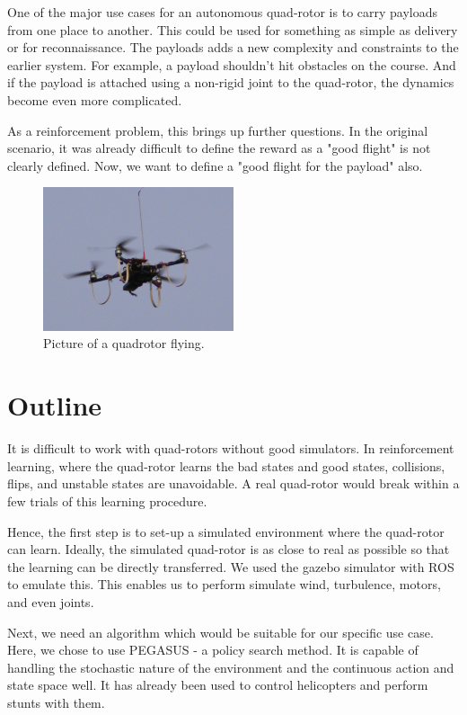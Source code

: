 \documentclass[BTech]{iitmdiss}
\begin{document}
One of the major use cases for an autonomous quad-rotor is to carry payloads from one place to another. This could be used for something as simple as delivery or for reconnaissance. The payloads adds a new complexity and constraints to the earlier system. For example, a payload shouldn't hit obstacles on the course. And if the payload is attached using a non-rigid joint to the quad-rotor, the dynamics become even more complicated.

As a reinforcement problem, this brings up further questions. In the original scenario, it was already difficult to define the reward as a "good flight" is not clearly defined. Now, we want to define a "good flight for the payload" also.

\begin{figure}[h]
  \centering
    \includegraphics[width=0.5\textwidth]{quadrotor.jpg}
    \caption{Picture of a quadrotor flying.}
\end{figure}

\section{Outline}

It is difficult to work with quad-rotors without good simulators. In reinforcement learning, where the quad-rotor learns the bad states and good states, collisions, flips, and unstable states are unavoidable. A real quad-rotor would break within a few trials of this learning procedure.

Hence, the first step is to set-up a simulated environment where the quad-rotor can learn. Ideally, the simulated quad-rotor is as close to real as possible so that the learning can be directly transferred. We used the gazebo simulator with ROS to emulate this. This enables us to perform simulate wind, turbulence, motors, and even joints.

Next, we need an algorithm which would be suitable for our specific use case. Here, we chose to use PEGASUS - a policy search method. It is capable of handling the stochastic nature of the environment and the continuous action and state space well. It has already been used to control helicopters and perform stunts with them.
\end{document}
